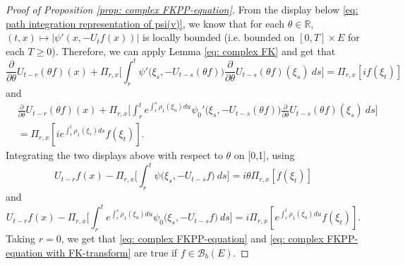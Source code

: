 \documentclass[12pt,a4paper]{amsart}
\theoremstyle{plain}
\theoremstyle{definition}
\numberwithin{equation}{section}
\begin{document}
\begin{proof}[Proof of Proposition \ref{prop: complex FKPP-equation}]
From the display below \eqref{eq: path integration representation of psi(v)}, we know that for each $\theta\in \mathbb R$, $(t,x) \mapsto |\psi'(x,-U_tf(x))|$ is locally bounded (i.e. bounded on $[0,T]\times E$ for each $T \geq 0$).
Therefore, we can apply Lemma \ref{eq: complex FK} and get that
\[
  \frac{\partial}{\partial \theta} U_{t-r}(\theta f)(x) + \Pi_{r,x} \Big[\int_r^t \psi'\big(\xi_s,- U_{t-s}(\theta f)\big)\frac{\partial}{\partial \theta} U_{t-s}(\theta f)(\xi_s)~ds\Big]
  = \Pi_{r,x} [i f(\xi_t)]
\]
and
\begin{align}
  & \frac{\partial}{\partial \theta} U_{t-r}(\theta f)(x) + \Pi_{r,x} \Big[\int_r^t e^{\int_r^s \rho_1(\xi_u)du}\psi_0'\big(\xi_s,- U_{t-s}(\theta f)\big)\frac{\partial}{\partial \theta} U_{t-s}(\theta f)(\xi_s)~ds\Big]\\
  & = \Pi_{r,x} [i e^{\int_r^t \rho_1(\xi_s)ds}f(\xi_t)].
\end{align}
Integrating the two displays above with respect to $\theta$  on [0,1], using 
\begin{equation}
  U_{t-r}f(x) - \Pi_{r,x} \Big[\int_r^t \psi\big(\xi_s,-U_{t-s}f\big) ~ds\Big]
  = i \theta \Pi_{r,x} [f(\xi_t)]
\end{equation}
and
\begin{equation}
  U_{t-r}f(x) - \Pi_{r,x} \Big[\int_r^t e^{\int_r^s \rho_1(\xi_u)du} \psi_0\big(\xi_s,- U_{t-s}f\big) ~ds\Big]
  = i \Pi_{r,x} [e^{\int_r^t\rho_1(\xi_u)du}f(\xi_t)].
\end{equation}
Taking $r = 0$, we get that \eqref{eq: complex FKPP-equation} and \eqref{eq: complex FKPP-equation with FK-transform} are true if $f\in \mathcal B_b(E)$.


\end{proof}
\end{document}
